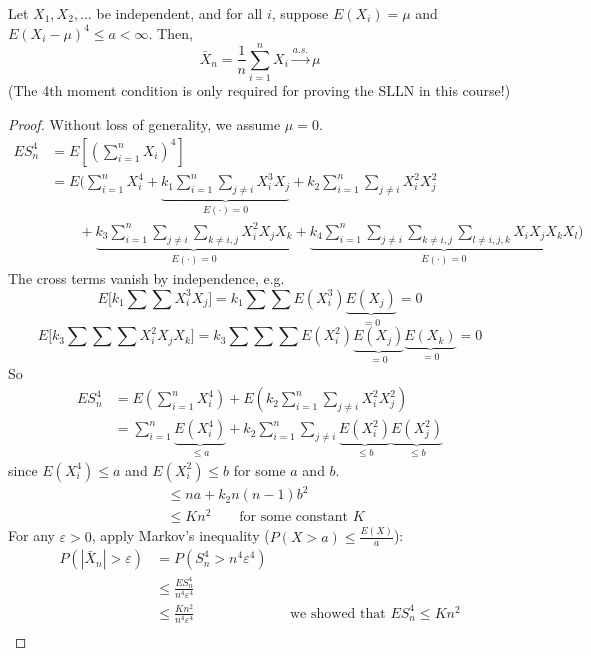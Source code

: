 \begin{theorem}
    Let $X_1, X_2, \dots$ be independent, and for all $i$, suppose $E(X_i) = \mu$ and $E(X_i - \mu)^4 \leq a < \infty$. Then,
    \[\bar{X}_n = \frac{1}{n}\sum_{i=1}^n X_i \overset{a.s.}{\longrightarrow} \mu\]
    (The 4th moment condition is only required for proving the SLLN in this course!)
    \begin{proof}
        Without loss of generality, we assume $\mu = 0$.
        \begin{align*}
            ES_n^4 &= E\left[\left(\sum_{i=1}^n X_i\right)^4\right]\\
            &= E\Big(\sum_{i=1}^n X_i^4 + \underbrace{k_1\sum_{i=1}^n\sum_{j\neq i} X_i^3X_j}_{E(\cdot) = 0} + k_2\sum_{i=1}^n\sum_{j\neq i} X_i^2X_j^2\\
            &\qquad + \underbrace{k_3\sum_{i=1}^n\sum_{j\neq i}\sum_{k\neq i,j} X_i^2X_jX_k}_{E(\cdot) = 0} + \underbrace{k_4\sum_{i=1}^n\sum_{j\neq i}\sum_{k\neq i,j}\sum_{l\neq i,j,k} X_iX_jX_kX_l}_{E(\cdot) = 0}\Big)
        \end{align*}
        The cross terms vanish by independence, e.g.
        \[E\Big[k_1\sum\sum X_i^3X_j\Big] = k_1\sum\sum E(X_i^3)\underbrace{E(X_j)}_{=0} = 0\]
        \[E\Big[k_3\sum\sum\sum X_i^2X_jX_k\Big] = k_3\sum\sum\sum E(X_i^2)\underbrace{E(X_j)}_{=0}\underbrace{E(X_k)}_{=0} = 0\]
        So
        \begin{align*}
            ES_n^4 &= E\left(\sum_{i=1}^n X_i^4\right) + E\left(k_2\sum_{i=1}^n\sum_{j\neq i} X_i^2X_j^2\right)\\
            &= \sum_{i=1}^n \underbrace{E(X_i^4)}_{\leq a} + k_2\sum_{i=1}^n\sum_{j\neq i}\underbrace{E(X_i^2)}_{\leq b}\underbrace{E(X_j^2)}_{\leq b}
        \end{align*}
        since $E(X_i^4) \leq a$ and $E(X_i^2) \leq b$ for some $a$ and $b$.
        \begin{align*}
            &\leq na + k_2 n(n-1)b^2\\
            &\leq Kn^2 \qquad \text{for some constant } K
        \end{align*}
        For any $\varepsilon > 0$, apply Markov's inequality ($P(X > a) \leq \frac{E(X)}{a}$):
        \begin{align*}
            P(|\bar{X}_n| > \varepsilon) &= P(S_n^4 > n^4\varepsilon^4)\\
            &\leq \frac{ES_n^4}{n^4\varepsilon^4}\\
            &\leq \frac{Kn^2}{n^4\varepsilon^4} & &\text{we showed that } ES_n^4 \leq Kn^2\\

\end{align*}
\end{proof}
\end{theorem}
